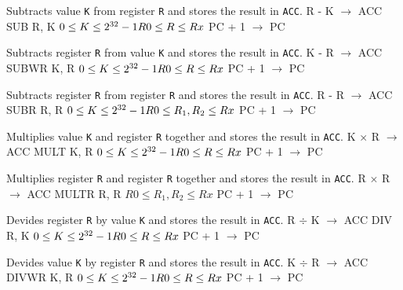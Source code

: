\documentclass[titlepage]{scrartcl}
\begin{document}
{Subtracts value \texttt{K} from register \texttt{R} and stores the result in \texttt{ACC}.}
{R - K $\rightarrow$ ACC}
{SUB R, K}
{$0 \leq K \leq 2^{32} - 1 \hfill \break R0 \leq R \leq Rx$}
{PC + 1 $\rightarrow$ PC}
{}
{}

{Subtracts register \texttt{R} from value \texttt{K} and stores the result in \texttt{ACC}.}
{K - R $\rightarrow$ ACC}
{SUBWR K, R}
{$0 \leq K \leq 2^{32} - 1 \hfill \break R0 \leq R \leq Rx$}
{PC + 1 $\rightarrow$ PC}
{}
{}

{Subtracts register \texttt{R} from register \texttt{R} and stores the result in \texttt{ACC}.}
{R - R $\rightarrow$ ACC}
{SUBR R, R}
{$0 \leq K \leq 2^{32} - 1 \hfill \break R0 \leq R_{1}, R_{2} \leq Rx$}
{PC + 1 $\rightarrow$ PC}
{}
{}

{Multiplies value \texttt{K} and register \texttt{R} together and stores the result in \texttt{ACC}.}
{K $\times$ R $\rightarrow$ ACC}
{MULT K, R}
{$0 \leq K \leq 2^{32} - 1 \hfill \break R0 \leq R \leq Rx$}
{PC + 1 $\rightarrow$ PC}
{}
{}

{Multiplies register \texttt{R} and register \texttt{R} together and stores the result in \texttt{ACC}.}
{R $\times$ R $\rightarrow$ ACC}
{MULTR R, R}
{$R0 \leq R_{1}, R_{2} \leq Rx$}
{PC + 1 $\rightarrow$ PC}
{}
{}

{Devides register \texttt{R} by value \texttt{K} and stores the result in \texttt{ACC}.}
{R $\div$ K $\rightarrow$ ACC}
{DIV R, K}
{$0 \leq K \leq 2^{32} - 1 \hfill \break R0 \leq R \leq Rx$}
{PC + 1 $\rightarrow$ PC}
{}
{}

{Devides value \texttt{K} by register \texttt{R} and stores the result in \texttt{ACC}.}
{K $\div$  R $\rightarrow$ ACC}
{DIVWR K, R}
{$0 \leq K \leq 2^{32} - 1 \hfill \break R0 \leq R \leq Rx$}
{PC + 1 $\rightarrow$ PC}
{}
{}
\end{document}
